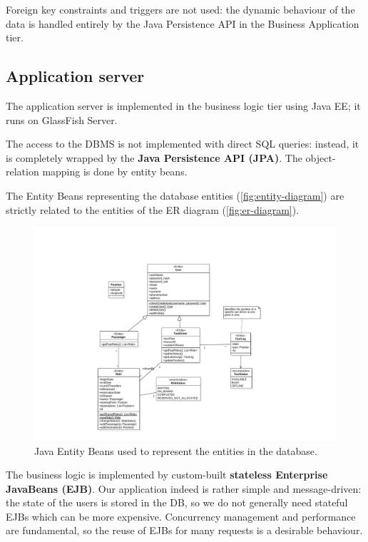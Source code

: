 Foreign key constraints and triggers are not used: the dynamic behaviour of the data is handled entirely by the Java Persistence API in the Business Application tier.

\subsection{Application server}
The application server is implemented in the business logic tier using Java EE; it runs on GlassFish Server.

The access to the DBMS is not implemented with direct SQL queries: instead, it is completely wrapped by the \textbf{Java Persistence API (JPA)}. The object-relation mapping is done by entity beans.

The Entity Beans representing the database entities (\autoref{fig:entity-diagram}) are strictly related to the entities of the ER diagram (\autoref{fig:er-diagram}).

\begin{figure}
    \centering
    \includegraphics[width=\textwidth]{diagrams/entity_diagram}
    \caption{Java Entity Beans used to represent the entities in the database.}
    \label{fig:entity-diagram}
\end{figure}

The business logic is implemented by custom-built \textbf{stateless Enterprise JavaBeans (EJB)}.
Our application indeed is rather simple and message-driven: the state of the users is stored in the DB, so we do not generally need stateful EJBs which can be more expensive.
Concurrency management and performance are fundamental, so the reuse of EJBs for many requests is a desirable behaviour.

